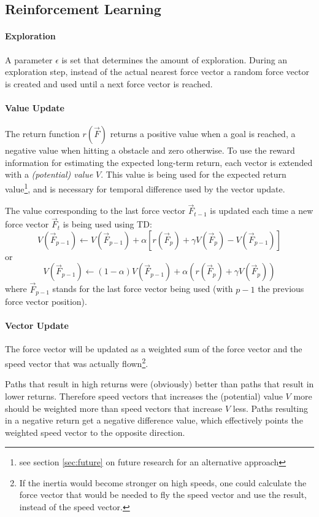 \documentclass[11pt]{article}
\begin{document}
\subsection{Reinforcement Learning}
\paragraph{Exploration}
A parameter $\epsilon$ is set that determines the amount of exploration. During an exploration step, instead of the actual nearest force vector a random force vector is created and used until a next force vector is reached.

\paragraph{Value Update}
The return function $r(\vec{F})$ returns a positive value when a goal is reached, a negative value when hitting a obstacle and zero otherwise. To use the reward information for estimating the expected long-term return, each vector is extended with a \emph{(potential) value} $V$. This value is being used for the expected return value\footnote{see section \ref{sec:future} on future research for an alternative approach}, and is necessary for temporal difference used by the vector update.

The value corresponding to the last force vector $\vec{F}_{t-1}$ is updated each time a new force vector $\vec{F}_t$ is being used using TD:
 \[ V(\vec{F}_{p-1}) \leftarrow V(\vec{F}_{p-1}) + \alpha [ r(\vec{F}_p) + \gamma V(\vec{F}_p) - V(\vec{F}_{p-1}) ] \]
or
 \[ V(\vec{F}_{p-1}) \leftarrow (1 - \alpha) V(\vec{F}_{p-1}) + \alpha ( r(\vec{F}_p) + \gamma V(\vec{F}_p) ) \]
where $\vec{F}_{p-1}$ stands for the last force vector being used (with $p-1$ the previous force vector position).


\paragraph{Vector Update}
The force vector will be updated as a weighted sum of the force vector and the speed vector that was actually flown\footnote{If the inertia would become stronger on high speeds, one could calculate the force vector that would be needed to fly the speed vector and use the result, instead of the speed vector.}.

Paths that result in high returns were (obviously) better than paths that result in lower returns. Therefore speed vectors that increases the (potential) value $V$ more should be weighted more than speed vectors that increase $V$ less. Paths resulting in a negative return get a negative difference value, which effectively points the weighted speed vector to the opposite direction.
\end{document}

